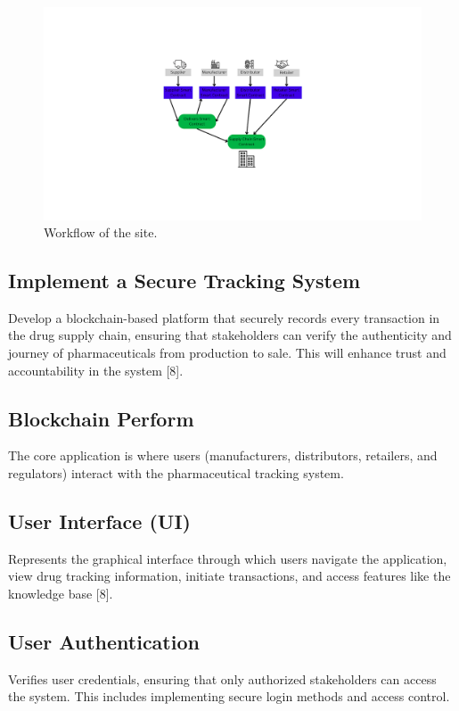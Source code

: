 \documentclass[conference]{IEEEtran}
\begin{document}
\begin{figure}[h]
    \centering
    \includegraphics[width=1\linewidth]{assets/enhanced_supplier.png}
    \caption{Workflow of the site.}
    \label{fig1}
\end{figure}

\subsection{Implement a Secure Tracking System} Develop a blockchain-based platform that securely records every transaction in the drug supply chain, ensuring that stakeholders can verify the authenticity and journey of pharmaceuticals from production to sale. This will enhance trust and accountability in the system [8].

\subsection{Blockchain Perform} The core application is where users (manufacturers, distributors, retailers, and regulators) interact with the pharmaceutical tracking system.

\subsection{ User Interface (UI)} Represents the graphical interface through which users navigate the application, view drug tracking information, initiate transactions, and access features like the knowledge base [8].

\subsection{User Authentication} Verifies user credentials, ensuring that only authorized stakeholders can access the system. This includes implementing secure login methods and access control.
\end{document}
